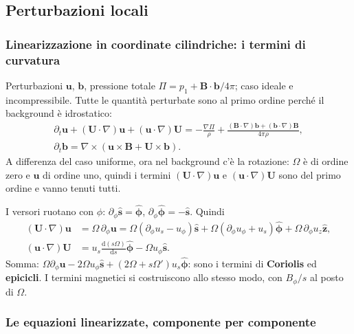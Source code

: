 \subsection{Perturbazioni locali}

\subsubsection{Linearizzazione in coordinate cilindriche: i termini di curvatura}

Perturbazioni $\mathbf{u}$, $\mathbf{b}$, pressione totale $\Pi=p_1+\mathbf{B}\cdot\mathbf{b}/4\pi$; caso ideale e incompressibile. Tutte le quantità perturbate sono al primo ordine perché il background è idrostatico:
\begin{gather}
\partial_t\mathbf{u}+(\mathbf{U}\cdot\nabla)\mathbf{u}+(\mathbf{u}\cdot\nabla)\mathbf{U}=-\frac{\nabla\Pi}{\rho}+\frac{(\mathbf{B}\cdot\nabla)\mathbf{b}+(\mathbf{b}\cdot\nabla)\mathbf{B}}{4\pi\rho},\\
\partial_t\mathbf{b}=\nabla\times(\mathbf{u}\times\mathbf{B}+\mathbf{U}\times\mathbf{b}).
\end{gather}
A differenza del caso uniforme, ora nel background c'è la rotazione: $\Omega$ è di ordine zero e $\mathbf{u}$ di ordine uno, quindi i termini $(\mathbf{U}\cdot\nabla)\mathbf{u}$ e $(\mathbf{u}\cdot\nabla)\mathbf{U}$ sono del primo ordine e vanno tenuti tutti.

I versori ruotano con $\phi$: $\partial_\phi\hat{\mathbf{s}}=\hat{\boldsymbol{\phi}}$, $\partial_\phi\hat{\boldsymbol{\phi}}=-\hat{\mathbf{s}}$. Quindi
\begin{align}
(\mathbf{U}\cdot\nabla)\mathbf{u}&=\Omega\,\partial_\phi\mathbf{u}=\Omega(\partial_\phi u_s-u_\phi)\hat{\mathbf{s}}+\Omega(\partial_\phi u_\phi+u_s)\hat{\boldsymbol{\phi}}+\Omega\,\partial_\phi u_z\hat{\mathbf{z}},\\
(\mathbf{u}\cdot\nabla)\mathbf{U}&=u_s\frac{\mathrm{d}(s\Omega)}{\mathrm{d}s}\hat{\boldsymbol{\phi}}-\Omega u_\phi\hat{\mathbf{s}}.
\end{align}
Somma: $\Omega\partial_\phi\mathbf{u}-2\Omega u_\phi\hat{\mathbf{s}}+(2\Omega+s\Omega')u_s\hat{\boldsymbol{\phi}}$: sono i termini di \textbf{Coriolis} ed \textbf{epicicli}. I termini magnetici si costruiscono allo stesso modo, con $B_\phi/s$ al posto di $\Omega$.

\subsubsection{Le equazioni linearizzate, componente per componente}

